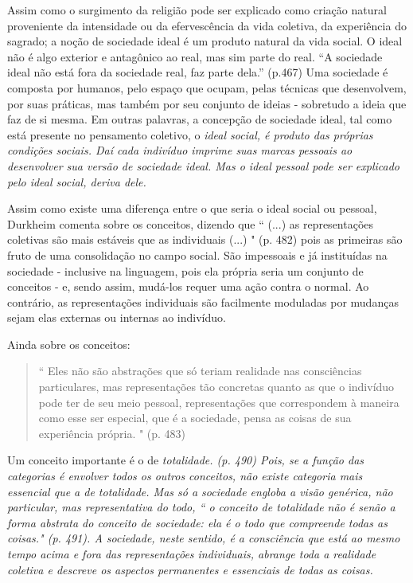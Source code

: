 \documentclass[12pt,a4paper]{article}
\begin{document}
Assim como o surgimento da religião pode ser explicado como criação natural proveniente da intensidade ou da efervescência da vida coletiva, da experiência do sagrado; a noção de sociedade ideal é um produto natural da vida social. O ideal não é algo exterior e antagônico ao real, mas sim parte do real. 
``A sociedade ideal não está fora da sociedade real, faz parte dela.”
(p.467)
Uma sociedade é composta por humanos, pelo espaço que ocupam, pelas técnicas que desenvolvem, por suas práticas, mas também por seu conjunto de ideias - sobretudo a ideia que faz de si mesma. Em outras palavras, a concepção de sociedade ideal, tal como está presente no pensamento coletivo, o \em ideal social\em, é produto das próprias condições sociais. Daí cada indivíduo imprime suas marcas pessoais ao desenvolver sua versão de sociedade ideal. Mas o \em ideal pessoal \em pode ser explicado pelo ideal social, deriva dele.

Assim como existe uma diferença entre o que seria o ideal social ou pessoal, Durkheim comenta sobre os conceitos, dizendo que
``
(...) as representações coletivas são mais estáveis que as individuais (...)
"
(p. 482)
pois as primeiras são fruto de uma consolidação no campo social. São impessoais e já instituídas na sociedade - inclusive na linguagem, pois ela própria seria um conjunto de conceitos - e, sendo assim, mudá-los requer uma ação contra o normal. Ao contrário, as representações individuais são facilmente moduladas por mudanças sejam elas externas ou internas ao indivíduo.

Ainda sobre os conceitos:

\begin{quote}
    ``
    Eles não são abstrações que só teriam realidade nas consciências particulares, mas representações tão concretas quanto as que o indivíduo pode ter de seu meio pessoal, representações que correspondem à maneira como esse ser especial, que é a sociedade, pensa as coisas de sua experiência própria.
    "
    (p. 483)
\end{quote}

Um conceito importante é o de \em totalidade\em. (p. 490) Pois, se a função das categorias é envolver todos os outros conceitos, não existe categoria mais essencial que a de totalidade. Mas só a sociedade engloba a visão genérica, não particular, mas representativa do todo, `` o conceito de totalidade não é senão a forma abstrata do conceito de sociedade: ela é o todo que compreende todas as coisas." (p. 491). A sociedade, neste sentido, é a consciência que está ao mesmo tempo acima e fora das representações individuais, abrange toda a realidade coletiva e descreve os aspectos permanentes e essenciais de todas as coisas.
\end{document}
